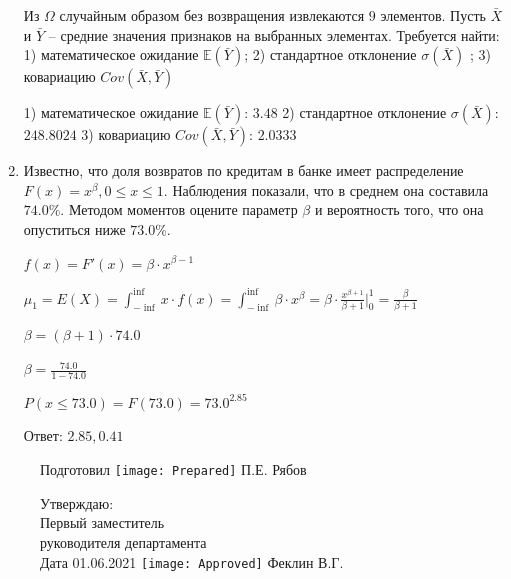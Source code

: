 \documentclass[a4paper,14pt]{article}
\begin{document}
\begin{enumerate}
Из $\Omega$ случайным образом без возвращения извлекаются $9$ элементов. 
Пусть $\bar X$ и $\bar Y$ – средние значения признаков на выбранных элементах. 
Требуется найти: 1) математическое ожидание $\mathbb{E}(\bar Y)$; 2) стандартное отклонение $\sigma(\bar X)$ ; 
3) ковариацию $Cov(\bar X, \bar Y)$




1) математическое ожидание $\mathbb{E}(\bar Y)$: $3.48$ 
2) стандартное отклонение $\sigma(\bar X)$: $248.8024$
3) ковариацию $Cov(\bar X, \bar Y)$: $2.0333$


\item

    
	Известно, что доля возвратов по кредитам в банке имеет распределение $F(x) = x^{\beta}, 0 \le x \le 1$. Наблюдения показали, что в среднем она составила $74.0$\%. Методом моментов оцените параметр $\beta$ и вероятность того, что она опуститься ниже $73.0$\%.
	


	

	$f(x) = F'(x) = \beta \cdot x^{\beta - 1}$

	$\mu_{1} = E(X) = \int_{-\inf}^{\inf}x \cdot f(x) = \int_{-\inf}^{\inf} \beta \cdot x^{\beta} = \beta \cdot \frac{x^{\beta + 1}}{\beta + 1}\bigg|_0^1 = \frac{\beta}{\beta + 1}$

	$\beta = (\beta + 1) \cdot 74.0$

	$\beta = \frac{74.0}{1 - 74.0}$

	$ P(x \le 73.0) = F(73.0) = 73.0^{2.85} $

    Ответ: $2.85, 0.41$
	

\end{enumerate}

\begin{figure}[H]
	Подготовил
	\hfill
	\texttt{[image: Prepared]}
	П.Е. Рябов
\end{figure}


\begin{figure}[H]
	Утверждаю:\\
	Первый заместитель\\
	руководителя департамента\\
	Дата 01.06.2021
	\hfill
	\texttt{[image: Approved]}
	Феклин В.Г.
\end{figure}
\end{document}
